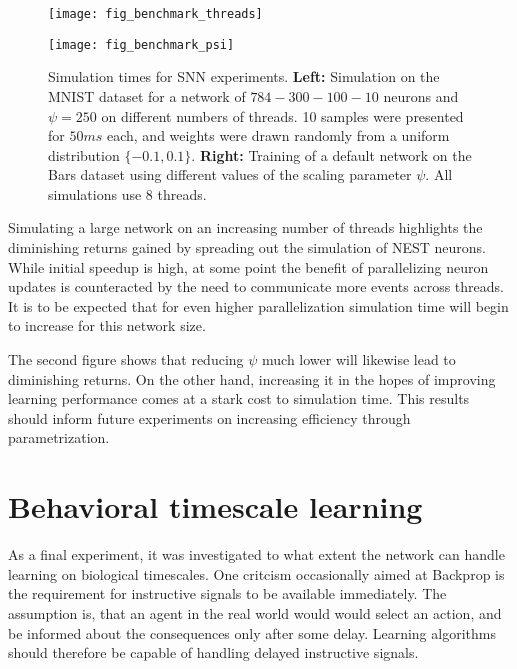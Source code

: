 \begin{figure}[h]
    \centering
    \begin{minipage}{0.5\textwidth}
        \centering
        \texttt{[image: fig\_benchmark\_threads]}
    \end{minipage}\hfill
    \begin{minipage}{0.5\textwidth}
        \centering
        \texttt{[image: fig\_benchmark\_psi]}
    \end{minipage}
    \caption{Simulation times for SNN experiments. \textbf{Left:} Simulation on the MNIST dataset for a network of
    $784-300-100-10$ neurons and $\psi=250$ on different numbers of threads. 10 samples were presented for $50ms$ each,
    and weights were drawn randomly from a uniform distribution $ \{-0.1, 0.1\}$. \textbf{Right:} Training of a default
    network on the Bars dataset using different values of the scaling parameter $\psi$. All simulations use 8 threads.}
    \label{fig-benchmark-threads-psi}
\end{figure}

Simulating a large network on an increasing number of threads highlights the diminishing returns gained by spreading out
the simulation of NEST neurons. While initial speedup is high, at some point the benefit of parallelizing neuron updates
is counteracted by the need to communicate more events across threads. It is to be expected that for even higher
parallelization simulation time will begin to increase for this network size.

The second figure shows that reducing $\psi$ much lower will likewise lead to diminishing returns. On the other hand,
increasing it in the hopes of improving learning performance comes at a stark cost to simulation time. This results 
should inform future experiments on increasing efficiency through parametrization.


\section{Behavioral timescale learning}

As a final experiment, it was investigated to what extent the network can handle learning on biological timescales. One
critcism occasionally aimed at Backprop is the requirement for instructive signals to be available immediately. The
assumption is, that an agent in the real world would would select an action, and be informed about the consequences
only after some delay. Learning algorithms should therefore be capable of handling delayed instructive signals. 

